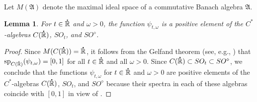 \documentclass{birkjour}
\newtheorem{lemma}[theorem]{Lemma}
\numberwithin{equation}{section}
\newcommand{\R}{\mathbb{R}}
\newcommand{\fA}{\mathfrak{A}}
\newcommand{\spe}{\operatorname{sp}}
\newcommand{\dR}{{\bf\dot{\R}}}
\begin{document}
Let $M(\fA)$ denote the maximal ideal space of a commutative
Banach algebra $\fA$.
\begin{lemma}\label{le:positive-elements}
For $t\in\dR$ and $\omega>0$, the function $\psi_{t,\omega}$ is a positive
element of the $C^*$-algebras $C(\dR)$, $SO_t$, and $SO^\diamond$.
\end{lemma}
\begin{proof}
Since $M(C(\dR))=\dR$, it follows from the Gelfand theorem (see, e.g.,
\cite[Theorem~2.1.3]{RSS11}) that $\spe_{C(\dR)}(\psi_{t,\omega})=[0,1]$
for all $t\in\dR$ and all $\omega>0$. Since
$C(\dR)\subset SO_t\subset SO^\diamond$, we conclude that
the functions $\psi_{t,\omega}$ for $t\in\dR$ and $\omega>0$ are positive
elements of the $C^*$-algebras $C(\dR)$, $SO_t$, and $SO^\diamond$
because their spectra in each of these algebras coincide with
$[0,1]$ in view of \cite[Proposition~4.1.5]{KR97}.
\end{proof}
\end{document}
